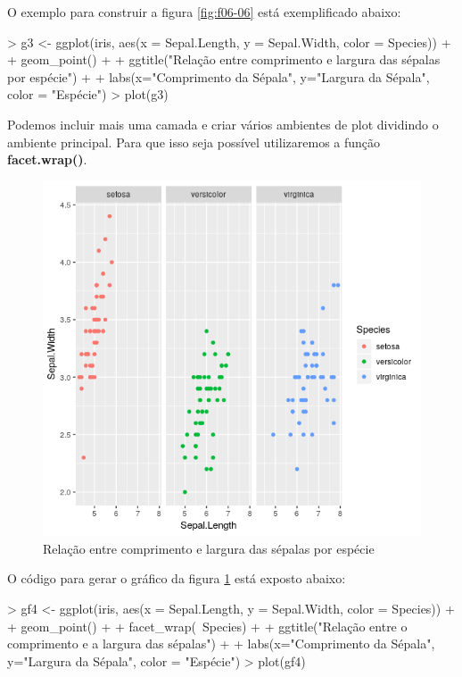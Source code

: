 \documentclass[12pt,a4paper,oneside]{erdc}
\begin{document}
O exemplo para construir a figura \ref{fig:f06-06} está exemplificado abaixo:

\begin{Schunk}
\begin{Sinput}
> g3 <- ggplot(iris, aes(x = Sepal.Length, y = Sepal.Width, color = Species)) + 
+ geom_point() +
+ ggtitle("Relação entre comprimento e largura das sépalas por espécie") +
+ labs(x="Comprimento da Sépala", y="Largura da Sépala", color = "Espécie")
> plot(g3)
\end{Sinput}
\end{Schunk}

Podemos incluir mais uma camada e criar vários ambientes de plot dividindo o ambiente principal. Para que isso seja possível utilizaremos a função \textbf{facet.wrap()}.

\begin{figure}[htpb!]
	\centering
	\includegraphics[width=0.7\linewidth]{../figs/BP_Curso_TecComp_00_2019_f06-07}
	\caption{Relação entre comprimento e largura das sépalas por espécie}
	\label{fig:f06-07}
\end{figure}

O código para gerar o gráfico da figura \ref{fig:f06-07} está exposto abaixo:

\begin{Schunk}
\begin{Sinput}
> gf4 <- ggplot(iris, aes(x = Sepal.Length, y = Sepal.Width, color = Species)) + 
+ geom_point() +
+ facet_wrap(~Species) +
+ ggtitle("Relação entre o comprimento e a largura das sépalas") +
+ labs(x="Comprimento da Sépala", y="Largura da Sépala", color = "Espécie")
> plot(gf4)
\end{Sinput}
\end{Schunk}
\end{document}
